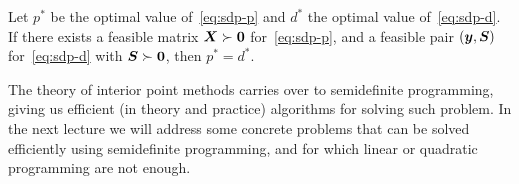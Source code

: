 \begin{theorem}
 Let $p^*$ be the optimal value of~\eqref{eq:sdp-p} and $d^*$ the optimal value of~\eqref{eq:sdp-d}. If there exists a feasible matrix $\bm{X}\succ \bm{0}$ for~\eqref{eq:sdp-p}, and a feasible pair $(\bm{y},\bm{S})$ for~\eqref{eq:sdp-d} with $\bm{S}\succ \bm{0}$, then $p^*=d^*$.
\end{theorem}

The theory of interior point methods carries over to semidefinite programming, giving us efficient (in theory and practice) algorithms for solving such problem. In the next lecture we will address some concrete problems that can be solved efficiently using semidefinite programming, and for which linear or quadratic programming are not enough.

